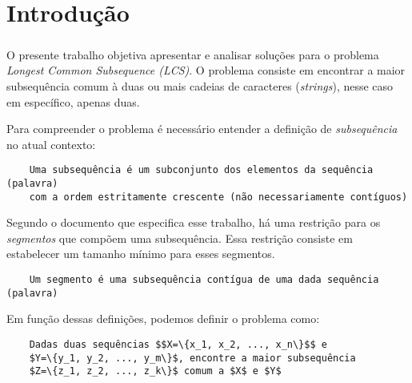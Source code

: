 \chapter{Introdução}

\paragraph*{}

O presente trabalho objetiva apresentar e analisar soluções para
o problema {\it Longest Common Subsequence (LCS)}. O problema 
consiste em encontrar a maior subsequência comum à duas ou 
mais cadeias de caracteres ({\it strings}), nesse caso em 
específico, apenas duas.

Para compreender o problema é necessário entender a definição
de \emph{ subsequência} no atual contexto:
\begin{verbatim}
    Uma subsequência é um subconjunto dos elementos da sequência (palavra)
    com a ordem estritamente crescente (não necessariamente contíguos)
\end{verbatim}

Segundo o documento que especifica esse trabalho, há uma restrição para os
\emph{segmentos} que compõem uma subsequência. Essa restrição consiste em 
estabelecer um tamanho mínimo para esses segmentos.
\begin{verbatim}
    Um segmento é uma subsequência contígua de uma dada sequência (palavra)
\end{verbatim}

Em função dessas definições, podemos definir o problema como:
\begin{verbatim}
    Dadas duas sequências $$X=\{x_1, x_2, ..., x_n\}$$ e 
    $Y=\{y_1, y_2, ..., y_m\}$, encontre a maior subsequência 
    $Z=\{z_1, z_2, ..., z_k\}$ comum a $X$ e $Y$
\end{verbatim}
